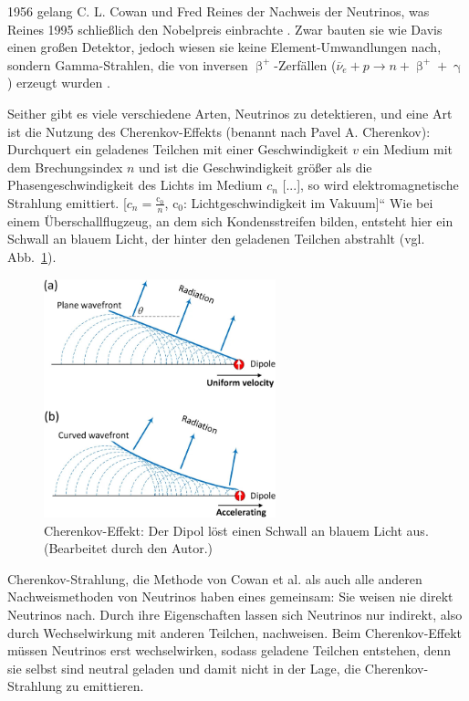 \documentclass[a4paper,12pt]{article}
\newcommand{\figref}[1]{Abb.~\ref{#1}}
\begin{document}
1956 gelang C. L. Cowan und Fred Reines der Nachweis der Neutrinos, was Reines 1995 schließlich den Nobelpreis einbrachte \cite{Cowan1956, NPOb}. Zwar bauten sie wie Davis einen großen Detektor, jedoch wiesen sie keine Element-Umwandlungen nach, sondern Gamma-Strahlen, die von inversen $\upbeta^+$-Zerfällen ($\overline{\nu}_e + p \rightarrow n + \upbeta^+ + \upgamma$) erzeugt wurden \cite{Cowan1956}. \par
Seither gibt es viele verschiedene Arten, Neutrinos zu detektieren, und eine Art ist die Nutzung des Cherenkov-Effekts (benannt nach Pavel A. Cherenkov): \glqq Durchquert ein geladenes Teilchen mit einer Geschwindigkeit $v$ ein Medium mit dem Brechungsindex $n$ und ist die Geschwindigkeit größer als die Phasengeschwindigkeit des Lichts im Medium $c_n$ [...], so wird elektromagnetische Strahlung emittiert. [$c_n= \frac{\mathrm{c_0}}{n}$,  $\mathrm{c_0}$: Lichtgeschwindigkeit im Vakuum]“ \cite[437]{Kolanoski2016} Wie bei einem Überschallflugzeug, an dem sich Kondensstreifen bilden, entsteht hier ein Schwall an blauem Licht, der hinter den geladenen Teilchen abstrahlt (vgl. \figref{fig:cherenkov}).
\begin{figure}[t!]
\centering
\includegraphics[width=0.6\textwidth, trim={0 410pt 0 0}, clip]{cherenkov}
\caption[Cherenkov-Effekt: Der Dipol löst einen Schwall an blauem Licht aus. (Bearbeitet durch den Autor.) -- Quelle: {\cite[][2]{Hu2017}}.]{Cherenkov-Effekt: Der Dipol löst einen Schwall an blauem Licht aus. (Bearbeitet durch den Autor.)}
\label{fig:cherenkov}
\end{figure} \par
Cherenkov-Strahlung, die Methode von Cowan et al. als auch alle anderen Nachweismethoden von Neutrinos haben eines gemeinsam: Sie weisen nie direkt Neutrinos nach. Durch ihre Eigenschaften lassen sich Neutrinos nur indirekt, also durch Wechselwirkung mit anderen Teilchen, nachweisen. Beim Cherenkov-Effekt müssen Neutrinos erst wechselwirken, sodass geladene Teilchen entstehen, denn sie selbst sind neutral geladen und damit nicht in der Lage, die Cherenkov-Strahlung zu emittieren.
\end{document}

